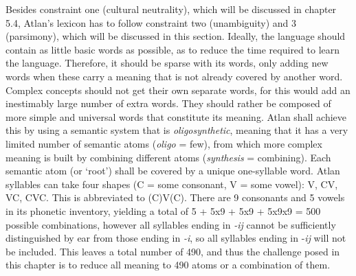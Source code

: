 Besides constraint one (cultural neutrality), which will be discussed in chapter 5.4, Atlan’s lexicon has to follow constraint two (unambiguity) and 3 (parsimony), which will be discussed in this section. Ideally, the language should contain as little basic words as possible, as to reduce the time required to learn the language. Therefore, it should be sparse with its words, only adding new words when these carry a meaning that is not already covered by another word. Complex concepts should not get their own separate words, for this would add an inestimably large number of extra words. They should rather be composed of more simple and universal words that constitute its meaning. Atlan shall achieve this by using a semantic system that is {\it oligosynthetic}, meaning that it has a very limited number of semantic atoms\footnotemark {}
(\textit{oligo}  = few), from which more complex meaning is built by combining different atoms (\textit{synthesis}  = combining). Each semantic atom (or ‘root’) shall be covered by a unique one-syllable word. Atlan syllables can take four shapes (C = some consonant, V = some vowel): V, CV, VC, CVC. This is abbreviated to (C)V(C). There are 9 consonants and 5 vowels in its phonetic inventory, yielding a total of 5 + 5x9 + 5x9 + 5x9x9 = 500 possible combinations, however all syllables ending in \textit{-ij} cannot be sufficiently distinguished by ear from those ending in \textit{-i}, so all syllables ending in -\textit{ij} will not be included. This leaves a total number of 490, and thus the challenge posed in this chapter is to reduce all meaning to 490 atoms or a combination of them.  


